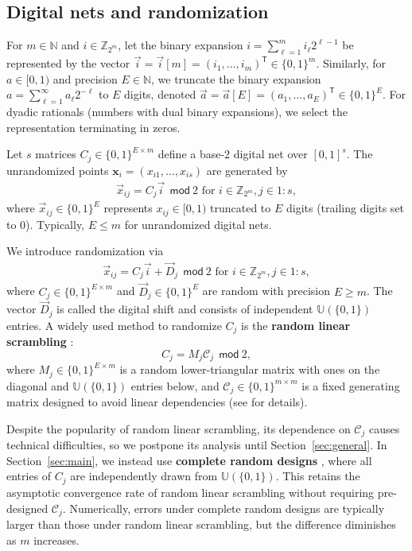 \documentclass{article}
\theoremstyle{definition}
\renewcommand{\ge}{\geqslant}
\renewcommand{\leq}{\leqslant}
\newcommand{\tmod}{\ \mathsf{mod}\ }
\newcommand{\ints}{\mathbb{Z}}
\newcommand{\natu}{\mathbb{N}}
\newcommand{\bsx}{\boldsymbol{x}}
\newcommand{\dunif}{\mathbb{U}}
\newcommand{\tran}{\mathsf{T}}
\begin{document}
\subsection{Digital nets and randomization}\label{subsec:nets}

For $m\in \natu$ and $i\in \ints_{2^m}$, let the binary expansion $i=\sum_{\ell=1}^{m}i_\ell 2^{\ell-1}$ be represented by the vector $\vec{i}=\vec{i}[m] = (i_1,\dots,i_m)^\tran\in\{0,1\}^m$. Similarly, for $a\in[0,1)$ and precision $E\in \natu$, we truncate the binary expansion $a=\sum_{\ell=1}^\infty a_\ell 2^{-\ell}$ to $E$ digits, denoted $\vec{a}=\vec{a}[E]=(a_1,\dots,a_E)^\tran\in\{0,1\}^E$. For dyadic rationals (numbers with dual binary expansions), we select the representation terminating in zeros.

Let $s$ matrices $C_j\in\{0,1\}^{E\times m}$ define a base-2 digital net over $[0,1]^s$. The unrandomized points $\bsx_i=(x_{i1},\dots,x_{is})$ are generated by
\begin{align}\label{eq:plainqmc}
\vec{x}_{ij} = C_j\vec{i} \ \tmod 2 \text{ for } i\in \ints_{2^m}, j\in1{:}s,
\end{align}
where $\vec{x}_{ij}\in \{0,1\}^E$ represents $x_{ij}\in [0,1)$ truncated to $E$ digits (trailing digits set to 0). Typically, $E\leq m$ for unrandomized digital nets.

We introduce randomization via
\begin{align}\label{eqn:xequalMCiplusD}
\vec{x}_{ij} = C_j\vec{i} + \vec{D}_j\ \tmod 2  \text{ for } i\in \ints_{2^m}, j\in1{:}s,
\end{align}
where $C_j\in \{0,1\}^{E\times m}$ and $\vec{D}_j\in\{0,1\}^E$ are random with precision $E\ge m$. The vector $\vec{D}_j$ is called the digital shift and consists of independent $\dunif(\{0,1\})$ entries. A widely used method to randomize $C_j$ is the \textbf{random linear scrambling} \cite{mato:1998:2}: 
$$C_j=M_j\mathcal{C}_j\ \tmod 2,$$
where $M_j\in \{0,1\}^{E\times m}$ is a random lower-triangular matrix with ones on the diagonal and $\dunif(\{0,1\})$ entries below, and $\mathcal{C}_j \in \{0,1\}^{m\times m}$ is a fixed generating matrix designed to avoid linear dependencies (see \cite[Chapter 4.4]{dick:pill:2010} for details).

Despite the popularity of random linear scrambling, its dependence on $\mathcal{C}_j$ causes technical difficulties, so we postpone its analysis until Section~\ref{sec:general}. In Section~\ref{sec:main}, we instead use \textbf{complete random designs} \cite{pan2024automatic}, where all entries of $C_j$ are independently drawn from $\dunif(\{0,1\})$. This retains the asymptotic convergence rate of random linear scrambling without requiring pre-designed $\mathcal{C}_j$. Numerically, errors under complete random designs are typically larger than those under random linear scrambling, but the difference diminishes as $m$ increases. 
\end{document}
